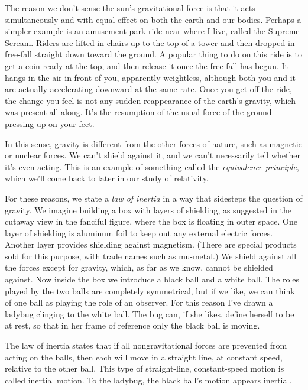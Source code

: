 The reason we don't sense the sun's gravitational force is that it acts simultaneously and with
equal effect on both the earth and our bodies. Perhaps a simpler example is an amusement park ride near
where I live, called the Supreme Scream. Riders are lifted in chairs up to the top of a tower and then
dropped in free-fall straight down toward the ground. A popular thing to do on this ride is to get a coin ready at the
top, and then release it once the free fall has begun. It  hangs in the air in front of you, apparently
weightless, although both you and it are actually accelerating downward at the same rate. Once you get
off the ride, the change you feel is not any sudden reappearance of the earth's gravity, which was present all
along. It's the resumption of the usual force of the ground pressing up on your feet.

In this sense, gravity is different from the other forces of nature, such as magnetic or nuclear forces.
We can't shield against it, and we can't necessarily tell whether it's even acting. This is an example
of something called the \emph{equivalence principle}, which we'll come back to later in our study of relativity.

\begin{figure}
\end{figure}

For these reasons, we state a \emph{law of inertia} in a way that sidesteps the question of gravity.
We imagine building a box with layers of shielding, as suggested in the cutaway view in the fanciful figure,
where the box is floating in outer space.
One layer of shielding is aluminum foil to keep out any external electric forces. Another layer provides
shielding against magnetism. (There are special products sold for this purpose, with trade names such
as mu-metal.) We shield against all the forces except for gravity, which, as far as we know, cannot be
shielded against. Now inside the box we introduce a black ball and a white ball. The roles played by the
two balls are completely symmetrical, but if we like, we can think of one ball as playing the role of
an observer. For this reason I've drawn a ladybug clinging to the white ball. The bug can, if she
likes, define herself to be at rest, so that in her frame of reference only the black ball is moving.

The law of inertia states that if all nongravitational forces are prevented from acting on the balls,
then each will move in a straight line, at constant speed, relative to the other ball. This type of
straight-line, constant-speed motion is called inertial motion. To the ladybug,
the black ball's motion appears inertial.

